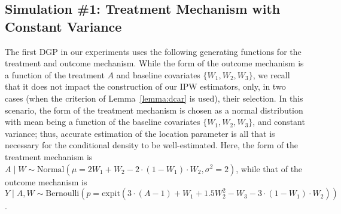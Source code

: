 \subsection{Simulation \#1: Treatment Mechanism with Constant
  Variance}\label{hose_sim_norm}

The first DGP in our experiments uses the following generating functions for the
treatment and outcome mechanism. While the form of the outcome mechanism is a
function of the treatment $A$ and baseline covariates $\{W_1, W_2, W_3\}$, we
recall that it does not impact the construction of our IPW estimators, only, in
two cases (when the criterion of Lemma~\ref{lemma:dcar} is used), their
selection. In this scenario, the form of the treatment mechanism is chosen as
a normal distribution with mean being a function of the baseline covariates
$\{W_1, W_2, W_3\}$, and constant variance; thus, accurate estimation of the
location parameter is all that is necessary for the conditional density to be
well-estimated. Here, the form of the treatment mechanism is
$A \mid W \sim \text{Normal}\left(\mu = 2 W_1 + W_2 - 2 \cdot (1 - W_1) \cdot
W_2, \sigma^2 = 2 \right)$, while that of the outcome mechanism is $Y \mid A, W
\sim \text{Bernoulli}\left(p = \text{expit}(3 \cdot (A - 1) + W_1 + 1.5 W_2^2 -
W_3 - 3 \cdot (1 - W_1) \cdot W_2) \right)$.

